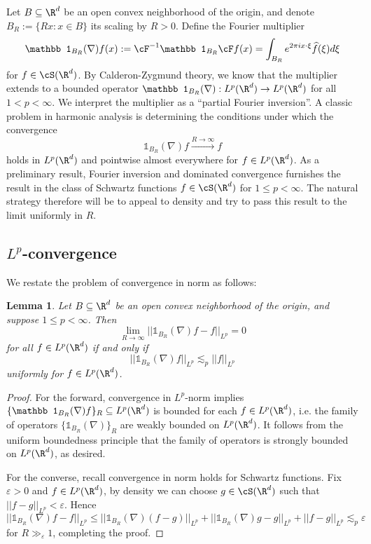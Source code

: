 \documentclass[reqno]{amsart}
\newtheorem{lemma}[theorem]{Lemma}
\theoremstyle{definition}
\theoremstyle{remark}
\renewcommand{\epsilon}{\varepsilon}
\begin{document}
Let $B \subseteq \R^d$ be an open convex neighborhood of the origin, and denote $B_R := \{ Rx : x \in B \}$ its scaling by $R > 0$. Define the Fourier multiplier
	\[ \mathbb 1_{B_R} (\nabla) f (x) := \cF^{-1} \mathbb 1_{B_R} \cF f (x)= \int_{B_R} e^{2\pi i x \cdot \xi} \widehat f (\xi) d \xi\]
for $f \in \cS (\R^d)$. By Calderon-Zygmund theory, we know that the multiplier extends to a bounded operator $\mathbb 1_{B_R} (\nabla) : L^p (\R^d) \to L^p (\R^d)$ for all $1 < p < \infty$. We interpret the multiplier as a ``partial Fourier inversion''. A classic problem in harmonic analysis is determining the conditions under which the convergence
	\[  \mathbb 1_{B_R} (\nabla) f \overset{R \to \infty}{\longrightarrow} f \]
holds in $L^p (\R^d)$ and pointwise almost everywhere for $f \in L^p (\R^d)$. As a preliminary result, Fourier inversion and dominated convergence furnishes the result in the class of Schwartz functions $f \in \cS (\R^d)$ for $1 \leq p < \infty$. The natural strategy therefore will be to appeal to density and try to pass this result to the limit uniformly in $R$.

\subsection{$L^p$-convergence}

We restate the problem of convergence in norm as follows:

\begin{lemma}
	Let $B \subseteq \R^d$ be an open convex neighborhood of the origin, and suppose $1 \leq p < \infty$. Then 
		\[ \lim_{R \to \infty} ||\mathbb 1_{B_R} (\nabla) f - f||_{L^p} = 0  \]
	for all $f \in L^p (\R^d)$ if and only if	
		\[ || \mathbb 1_{B_R} (\nabla) f ||_{L^p} \lesssim_p ||f||_{L^p} \]
	uniformly for $f \in L^p (\R^d)$. 	
\end{lemma}

\begin{proof}
	For the forward, convergence in $L^p$-norm implies $\{ \mathbb 1_{B_R} (\nabla) f\}_R \subseteq L^p (\R^d)$ is bounded for each $f \in L^p (\R^d)$, i.e. the family of operators $\{\mathbb 1_{B_R} (\nabla)\}_R$ are weakly bounded on $L^p (\R^d)$. It follows from the uniform boundedness principle that the family of operators is strongly bounded on $L^p (\R^d)$, as desired. 
	
	For the converse, recall convergence in norm holds for Schwartz functions. Fix $\epsilon > 0$ and $f \in L^p (\R^d)$, by density we can choose $g \in \cS (\R^d)$ such that $||f - g||_{L^p} < \epsilon$. Hence
		\[ ||\mathbb 1_{B_R} (\nabla) f - f||_{L^p} \leq || \mathbb 1_{B_R} (\nabla) (f - g)||_{L^p} + || \mathbb 1_{B_R} (\nabla) g - g||_{L^p} + ||f - g||_{L^p} \lesssim_p \epsilon\]
	for $R \gg_\epsilon 1$, completing the proof. 	
\end{proof}
\end{document}
